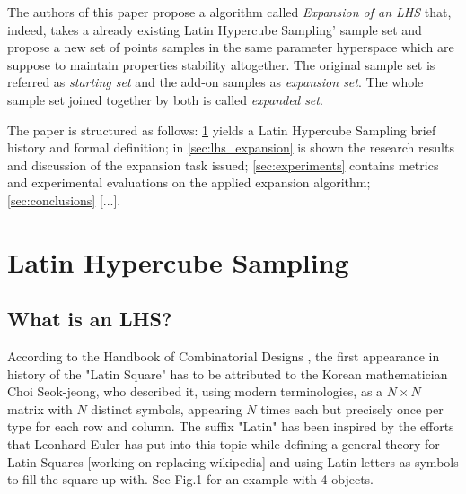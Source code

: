 \documentclass[12pt]{extarticle}
\begin{document}
The authors of this paper propose a algorithm called \textit{Expansion of an LHS} that, indeed, takes a already existing Latin Hypercube Sampling' sample set and propose a new set of points samples in the same parameter hyperspace which are suppose to maintain properties stability altogether.
The original sample set is referred as \textit{starting set} and the add-on samples as \textit{expansion set}. The whole sample set joined together by both is called \textit{expanded set}.

The paper is structured as follows: \cref{sec:lhs} yields a Latin Hypercube Sampling brief history and formal definition; in \cref{sec:lhs_expansion} is shown the research results and discussion of the expansion task issued; \cref{sec:experiments} contains metrics and experimental evaluations on the applied expansion algorithm; \cref{sec:conclusions} [...].

\section{Latin Hypercube Sampling}
\label{sec:lhs}
\subsection{What is an LHS?}
\label{subsec:what_is_an_lhs}
According to the Handbook of Combinatorial Designs , the first appearance in history of the "Latin Square" has to be attributed to the Korean mathematician Choi Seok-jeong, who described it, using modern terminologies, as a $N \times N$ matrix with $N$ distinct symbols, appearing $N$ times each but precisely once per type for each row and column. The suffix "Latin" has been inspired by the efforts that Leonhard Euler has put into this topic while defining a general theory for Latin Squares  [working on replacing wikipedia] and using Latin letters as symbols to fill the square up with. See Fig.1 for an example with 4 objects.
\end{document}
